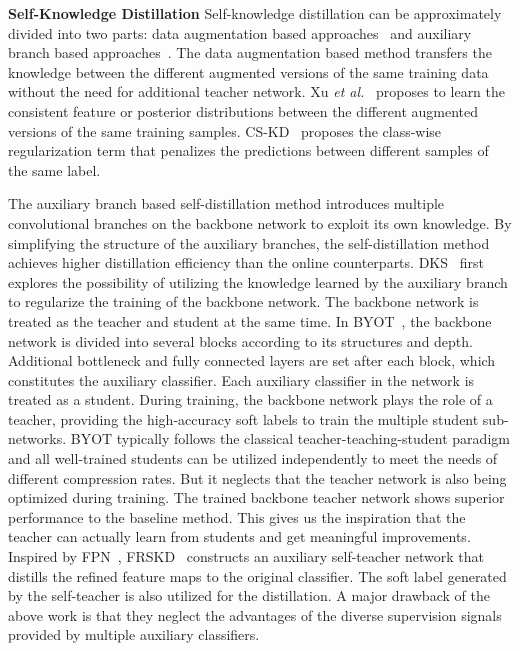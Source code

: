 \documentclass[letterpaper]{article} %
\begin{document}
\noindent\textbf{Self-Knowledge Distillation} Self-knowledge distillation can be approximately divided into two parts: data augmentation based approaches~\cite{xu2019data,yun2020regularizing} and auxiliary branch based approaches~\cite{zhang2019your,ji2021refine}. 
The data augmentation based method transfers the knowledge between the different augmented versions of the same training data without the need for additional teacher network. Xu \textit{et al.}~\cite{xu2019data} proposes to learn the consistent feature or posterior distributions between the different augmented versions of the same training samples. CS-KD~\cite{yun2020regularizing} proposes the class-wise regularization term that penalizes the predictions between different samples of the same label.

The auxiliary branch based self-distillation method introduces multiple convolutional branches on the backbone network to exploit its own knowledge. By simplifying the structure of the auxiliary branches, the self-distillation method achieves higher distillation efficiency than the online counterparts. DKS~\cite{sun2019deeply} first explores the possibility of utilizing the knowledge learned by the auxiliary branch to regularize the training of the backbone network. The backbone network is treated as the teacher and student at the same time. In BYOT~\cite{zhang2019your}, the backbone network is divided into several blocks according to its structures and depth. Additional bottleneck and fully connected layers are set after each block, which constitutes the auxiliary classifier. Each auxiliary classifier in the network is treated as a student. During training, the backbone network plays the role of a teacher, providing the high-accuracy soft labels to train the multiple student sub-networks. BYOT typically follows the classical teacher-teaching-student paradigm and all well-trained students can be utilized independently to meet the needs of different compression rates. But it neglects that the teacher network is also being optimized during training. The trained backbone teacher network shows superior performance to the baseline method. This gives us the inspiration that the teacher can actually learn from students and get meaningful improvements.
Inspired by FPN~\cite{lin2017feature}, FRSKD~\cite{ji2021refine} constructs an auxiliary self-teacher network that distills the refined feature maps to the original classifier. The soft label generated by the self-teacher is also utilized for the distillation. A major drawback of the above work is that they neglect the advantages of the diverse supervision signals provided by multiple auxiliary classifiers.
\end{document}
